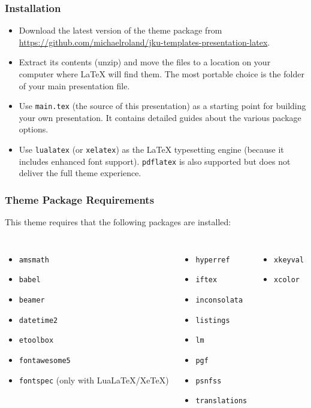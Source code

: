 \documentclass[utf8,aspectratio=169,ngerman,english]{beamer}
\begin{document}
\begin{frame}
\frametitle{Installation}

\begin{itemize}
\item Download the latest version of the theme package from \url{https://github.com/michaelroland/jku-templates-presentation-latex}.
\item Extract its contents (unzip) and move the files to a location on your computer where {\LaTeX} will find them. The most portable choice is the folder of your main presentation file.
\item Use \texttt{main.tex} (the source of this presentation) as a starting point for building your own presentation. It contains detailed guides about the various package options.
\item Use \texttt{lualatex} (or \texttt{xelatex}) as the {\LaTeX} typesetting engine (because it includes enhanced font support). \texttt{pdflatex} is also supported but does not deliver the full theme experience.
\end{itemize}
\end{frame}


\begin{frame}
\frametitle{Theme Package Requirements}

This theme requires that the following packages are installed:
\begin{columns}[onlytextwidth]
\begin{itemize}
\item \texttt{amsmath}
\item \texttt{babel}
\item \texttt{beamer}
\item \texttt{datetime2}
\item \texttt{etoolbox}
\item \texttt{fontawesome5}
\item \texttt{fontspec} (only with LuaLaTeX/XeTeX)
\end{itemize}

\begin{itemize}
\item \texttt{hyperref}
\item \texttt{iftex}
\item \texttt{inconsolata}
\item \texttt{listings}
\item \texttt{lm}
\item \texttt{pgf}
\item \texttt{psnfss}
\item \texttt{translations}
\end{itemize}

\begin{itemize}
\item \texttt{xkeyval}
\item \texttt{xcolor}
\end{itemize}
\end{columns}
\end{frame}
\end{document}
